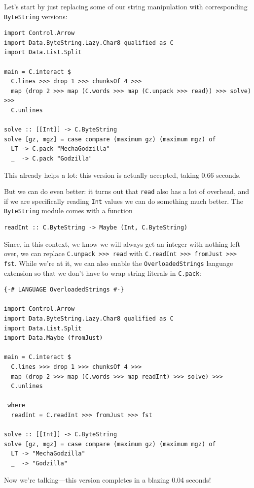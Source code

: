 \documentclass{book}
\newcommand{\h}[1]{\texttt{#1}}
\begin{document}
Let's start by just replacing some of our string manipulation with
corresponding \h{ByteString} versions:

\begin{verbatim}
import Control.Arrow
import Data.ByteString.Lazy.Char8 qualified as C
import Data.List.Split

main = C.interact $
  C.lines >>> drop 1 >>> chunksOf 4 >>>
  map (drop 2 >>> map (C.words >>> map (C.unpack >>> read)) >>> solve) >>>
  C.unlines

solve :: [[Int]] -> C.ByteString
solve [gz, mgz] = case compare (maximum gz) (maximum mgz) of
  LT -> C.pack "MechaGodzilla"
  _  -> C.pack "Godzilla"
\end{verbatim}

This already helps a lot: this version is actually accepted, taking
0.66 seconds.

But we can do even better: it turns out that \h{read} also has a lot of
overhead, and if we are specifically reading \h{Int} values we can do
something much better.  The \h{ByteString} module comes with a function
\begin{verbatim}
readInt :: C.ByteString -> Maybe (Int, C.ByteString)
\end{verbatim}
Since, in this context, we know we will always get an integer with
nothing left over, we can replace \h{C.unpack >>> read} with \h{C.readInt
>>> fromJust >>> fst}.  While we're at it, we can also enable the
\h{OverloadedStrings} language extension so that we don't have to wrap
string literals in \h{C.pack}:

\begin{verbatim}
{-# LANGUAGE OverloadedStrings #-}

import Control.Arrow
import Data.ByteString.Lazy.Char8 qualified as C
import Data.List.Split
import Data.Maybe (fromJust)

main = C.interact $
  C.lines >>> drop 1 >>> chunksOf 4 >>>
  map (drop 2 >>> map (C.words >>> map readInt) >>> solve) >>>
  C.unlines

 where
  readInt = C.readInt >>> fromJust >>> fst

solve :: [[Int]] -> C.ByteString
solve [gz, mgz] = case compare (maximum gz) (maximum mgz) of
  LT -> "MechaGodzilla"
  _  -> "Godzilla"
\end{verbatim}
Now we're talking---this version completes in a blazing 0.04 seconds!

\end{document}
